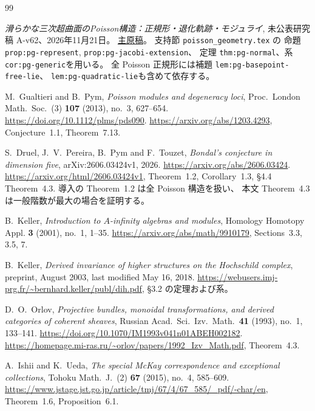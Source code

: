 \begin{thebibliography}{99}
\setlength{\itemsep}{0pt}
\setlength{\parsep}{0pt}
\setlength{\parskip}{0pt}

\emph{滑らかな三次超曲面のPoisson構造：正規形・退化軌跡・モジュライ},
未公表研究稿 A-v62、2026年11月21日。
\href{https://github.com/uedakazushi/poisson-cubic/blob/9f91efa3465f18219c36c31750f1e66220faeaa7/papers/poisson-cubic.tex}{主原稿}。
支持節 \texttt{poisson\_geometry.tex} の
命題 \texttt{prop:pg-represent}, \texttt{prop:pg-jacobi-extension}、
定理 \texttt{thm:pg-normal}、系 \texttt{cor:pg-generic}を用いる。
全 Poisson 正規形には補題 \texttt{lem:pg-basepoint-free-lie}、
\texttt{lem:pg-quadratic-lie}も含めて依存する。

M.~Gualtieri and B.~Pym,
\emph{Poisson modules and degeneracy loci},
Proc.\ London Math.\ Soc.\ (3) \textbf{107} (2013), no.~3, 627--654.
\url{https://doi.org/10.1112/plms/pds090}.
\url{https://arxiv.org/abs/1203.4293},
Conjecture~1.1, Theorem~7.13.

S.~Druel, J.~V.~Pereira, B.~Pym and F.~Touzet,
\emph{Bondal's conjecture in dimension five},
arXiv:2606.03424v1, 2026.
\url{https://arxiv.org/abs/2606.03424}.
\url{https://arxiv.org/html/2606.03424v1},
Theorem~1.2, Corollary~1.3, \S4.4 Theorem~4.3.
導入の Theorem~1.2 は全 Poisson 構造を扱い、
本文 Theorem~4.3 は一般階数が最大の場合を証明する。

B.~Keller, \emph{Introduction to $A$-infinity algebras and modules},
Homology Homotopy Appl. \textbf{3} (2001), no.~1, 1--35.
\url{https://arxiv.org/abs/math/9910179}, Sections~3.3, 3.5, 7.

B.~Keller,
\emph{Derived invariance of higher structures on the Hochschild complex},
preprint, August 2003, last modified May 16, 2018.
\url{https://webusers.imj-prg.fr/~bernhard.keller/publ/dih.pdf},
\S3.2 の定理および系。

D.~O.~Orlov,
\emph{Projective bundles, monoidal transformations, and derived categories
of coherent sheaves},
Russian Acad.\ Sci.\ Izv.\ Math.\ \textbf{41} (1993), no.~1, 133--141.
\url{https://doi.org/10.1070/IM1993v041n01ABEH002182}.
\url{https://homepage.mi-ras.ru/~orlov/papers/1992_Izv_Math.pdf},
Theorem~4.3.

A.~Ishii and K.~Ueda,
\emph{The special McKay correspondence and exceptional collections},
Tohoku Math.\ J.\ (2) \textbf{67} (2015), no.~4, 585--609.
\url{https://www.jstage.jst.go.jp/article/tmj/67/4/67_585/_pdf/-char/en},
Theorem~1.6, Proposition~6.1.


\end{thebibliography}

